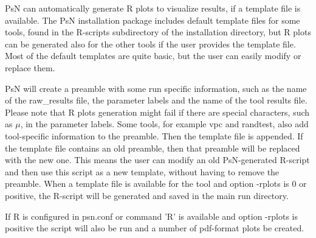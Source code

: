 
PsN can automatically generate R plots to visualize results, if a template file is available. The PsN installation package includes default template files for some tools, found in the R-scripts subdirectory of the installation directory, but R plots can be generated also for the other tools if the user provides the template file. Most of the default templates are quite basic, but 
the user can easily modify or replace them.

PsN will create a preamble with some run specific information, such as the name of the raw\_results file, the parameter labels and the name of the tool results file. Please note that R plots generation might fail if there are special characters, such as $\mu$, in the parameter labels. Some tools, for example vpc and randtest, also add tool-specific information to the preamble. Then the template file is appended. If the template file contains an old preamble, then that preamble will be replaced with the new one. This means the user can modify an old PsN-generated R-script and then use this script as a new template, without having to remove the preamble. When a template file is available for the tool and option \mbox{-rplots} is 0 or positive, the R-script will be generated and saved in the main run directory. 

If R is configured in psn.conf or command 'R' is available and option -rplots is positive the script will also be run and a number of pdf-format plots be created.

\rplotsconditions

